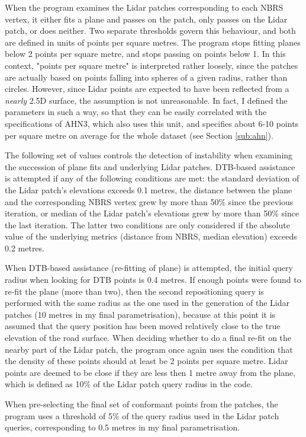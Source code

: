 When the program examines the Lidar patches corresponding to each NBRS vertex, it either fits a plane and passes on the patch, only passes on the Lidar patch, or does neither. Two separate thresholds govern this behaviour, and both are defined in units of points per square metres. The program stops fitting planes below 2 points per square metre, and stops passing on points below 1. In this context, "points per square metre" is interpreted rather loosely, since the patches are actually based on points falling into spheres of a given radius, rather than circles. However, since Lidar points are expected to have been reflected from a \textit{nearly} 2.5D surface, the assumption is not unreasonable. In fact, I defined the parameters in such a way, so that they can be easily correlated with the specifications of AHN3, which also uses this unit, and specifies about 6-10 points per square metre on average for the whole dataset (see Section \ref{sub:ahn}).

The following set of values controls the detection of instability when examining the succession of plane fits and underlying Lidar patches. DTB-based assistance is attempted if any of the following conditions are met: the standard deviation of the Lidar patch's elevations exceeds 0.1 metres, the distance between the plane and the corresponding NBRS vertex grew by more than 50\% since the previous iteration, or median of the Lidar patch's elevations grew by more than 50\% since the last iteration. The latter two conditions are only considered if the absolute value of the underlying metrics (distance from NBRS, median elevation) exceeds 0.2 metres.

When DTB-based assistance (re-fitting of plane) is attempted, the initial query radius when looking for DTB points is 0.4 metres. If enough points were found to re-fit the plane (more than two), then the second repositioning query is performed with the same radius as the one used in the generation of the Lidar patches (10 metres in my final parametrisation), because at this point it is assumed that the query position has been moved relatively close to the true elevation of the road surface. When deciding whether to do a final re-fit on the nearby part of the Lidar patch, the program once again uses the condition that the density of these points should at least be 2 points per square metre. Lidar points are deemed to be close if they are less then 1 metre away from the plane, which is defined as 10\% of the Lidar patch query radius in the code.

When pre-selecting the final set of conformant points from the patches, the program uses a threshold of 5\% of the query radius used in the Lidar patch queries, corresponding to 0.5 metres in my final parametrisation.

